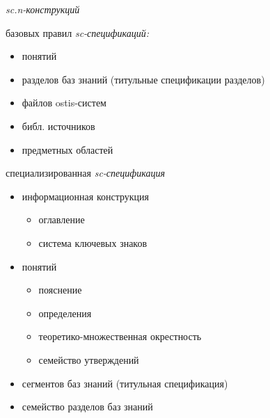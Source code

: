 \begin{SCn}
{\begin{scnitemize}
	\item\textit{sc.n-конструкций}
	\item базовых правил \textit{sc-спецификаций:}
	\begin{itemize}
		\item понятий 
		\item разделов баз знаний (титульные спецификации разделов)
		\item файлов ostis-систем
		\item библ. источников
		\item предметных областей 	
	\end{itemize}
	\item специализированная \textit{sc-спецификация}
	\begin{itemize}
		\item информационная конструкция
		\begin{itemize}
			\item оглавление
			\item система ключевых знаков	
		\end{itemize}
	\end{itemize}
	\begin{itemize}
		\item понятий
		\begin{itemize}
			\item пояснение
			\item определения
			\item теоретико-множественная окрестность
			\item семейство утверждений	
		\end{itemize}
	\end{itemize}
	\begin{itemize}
		\item сегментов баз знаний (титульная спецификация)
		\item семейство разделов баз знаний	
	\end{itemize}
\end{scnitemize}}

\scniselement{\scnstartsetlocal\scnendstructlocal}


\end{SCn}
